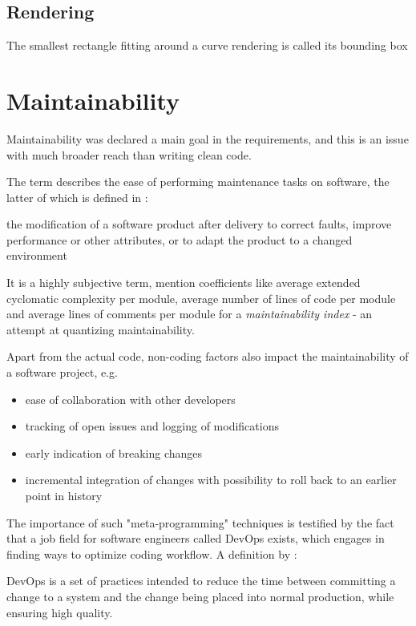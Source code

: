 \subsection{Rendering}
The smallest rectangle fitting around a curve rendering is called its  \gls{bounding box}
\section{Maintainability}\label{sec:maintainability}
Maintainability was declared a main goal in the requirements, and this is an issue with much broader reach than writing clean code.

The term describes the ease of performing maintenance tasks on software, the latter of which is defined in \citet[p.234]{Bray1997} :
\begin{definition}[maintenance]
the modification of a software product after delivery to correct faults, improve performance or other attributes, or to adapt the product to a changed environment
\end{definition}

It is a highly subjective term, \citet[p.231]{Bray1997} mention coefficients like average extended cyclomatic complexity per module, average number of lines of code per module and average lines of comments per module for a \textit{maintainability index} - an attempt at quantizing maintainability.

Apart from the actual code, non-coding factors also impact the maintainability of a software project, e.g.
\begin{itemize}
	\item ease of collaboration with other developers
	\item tracking of open issues and logging of modifications
	\item early indication of breaking changes
	\item incremental integration of changes with possibility to roll back to an earlier point in history
\end{itemize}

The importance of such "meta-programming" techniques is testified by the fact that a job field for software engineers called \gls{DevOps} exists, which engages in finding ways to optimize coding workflow.
A definition by \citet[p.23]{Bass2015}:
\begin{definition}[DevOps]
	DevOps is a set of practices intended to reduce the time between committing a change to a system and the change being placed into normal production, while ensuring high quality.
\end{definition}

